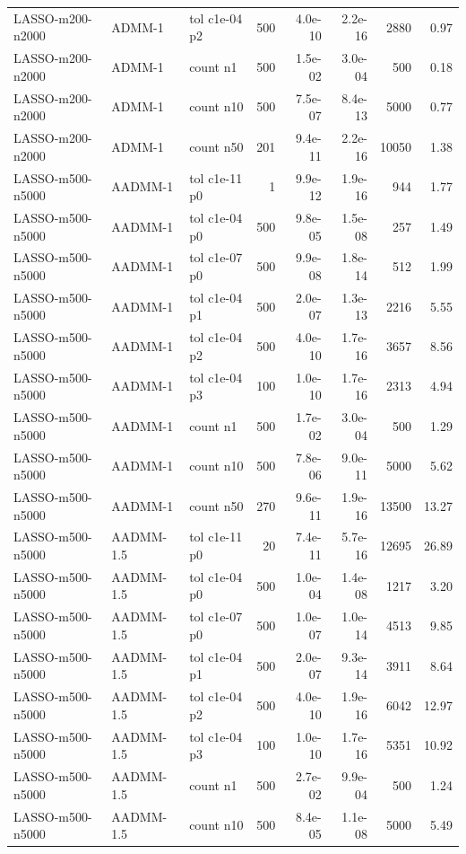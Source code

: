\begin{tabular}{lllrrrrr}
LASSO-m200-n2000 & ADMM-1 & tol c1e-04 p2 & 500 & 4.0e-10 & 2.2e-16 & 2880 & 0.97\\
LASSO-m200-n2000 & ADMM-1 & count n1 & 500 & 1.5e-02 & 3.0e-04 & 500 & 0.18\\
LASSO-m200-n2000 & ADMM-1 & count n10 & 500 & 7.5e-07 & 8.4e-13 & 5000 & 0.77\\
LASSO-m200-n2000 & ADMM-1 & count n50 & 201 & 9.4e-11 & 2.2e-16 & 10050 & 1.38\\
LASSO-m500-n5000 & AADMM-1 & tol c1e-11 p0 & 1 & 9.9e-12 & 1.9e-16 & 944 & 1.77\\
LASSO-m500-n5000 & AADMM-1 & tol c1e-04 p0 & 500 & 9.8e-05 & 1.5e-08 & 257 & 1.49\\
LASSO-m500-n5000 & AADMM-1 & tol c1e-07 p0 & 500 & 9.9e-08 & 1.8e-14 & 512 & 1.99\\
LASSO-m500-n5000 & AADMM-1 & tol c1e-04 p1 & 500 & 2.0e-07 & 1.3e-13 & 2216 & 5.55\\
LASSO-m500-n5000 & AADMM-1 & tol c1e-04 p2 & 500 & 4.0e-10 & 1.7e-16 & 3657 & 8.56\\
LASSO-m500-n5000 & AADMM-1 & tol c1e-04 p3 & 100 & 1.0e-10 & 1.7e-16 & 2313 & 4.94\\
LASSO-m500-n5000 & AADMM-1 & count n1 & 500 & 1.7e-02 & 3.0e-04 & 500 & 1.29\\
LASSO-m500-n5000 & AADMM-1 & count n10 & 500 & 7.8e-06 & 9.0e-11 & 5000 & 5.62\\
LASSO-m500-n5000 & AADMM-1 & count n50 & 270 & 9.6e-11 & 1.9e-16 & 13500 & 13.27\\
LASSO-m500-n5000 & AADMM-1.5 & tol c1e-11 p0 & 20 & 7.4e-11 & 5.7e-16 & 12695 & 26.89\\
LASSO-m500-n5000 & AADMM-1.5 & tol c1e-04 p0 & 500 & 1.0e-04 & 1.4e-08 & 1217 & 3.20\\
LASSO-m500-n5000 & AADMM-1.5 & tol c1e-07 p0 & 500 & 1.0e-07 & 1.0e-14 & 4513 & 9.85\\
LASSO-m500-n5000 & AADMM-1.5 & tol c1e-04 p1 & 500 & 2.0e-07 & 9.3e-14 & 3911 & 8.64\\
LASSO-m500-n5000 & AADMM-1.5 & tol c1e-04 p2 & 500 & 4.0e-10 & 1.9e-16 & 6042 & 12.97\\
LASSO-m500-n5000 & AADMM-1.5 & tol c1e-04 p3 & 100 & 1.0e-10 & 1.7e-16 & 5351 & 10.92\\
LASSO-m500-n5000 & AADMM-1.5 & count n1 & 500 & 2.7e-02 & 9.9e-04 & 500 & 1.24\\
LASSO-m500-n5000 & AADMM-1.5 & count n10 & 500 & 8.4e-05 & 1.1e-08 & 5000 & 5.49\\

\end{tabular}
